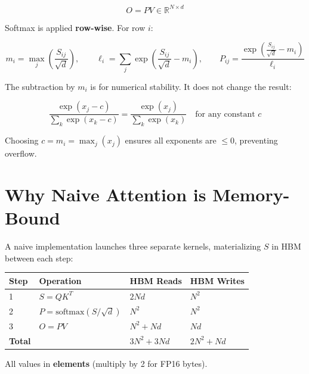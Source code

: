 \documentclass[11pt, letterpaper]{article}
\newcommand{\R}{\mathbb{R}}
\begin{document}
\begin{equation}
O = P V \in \R^{N \times d}
\end{equation}

Softmax is applied \textbf{row-wise}. For row $i$:

\begin{equation}
m_i = \max_j\!\left(\frac{S_{ij}}{\sqrt{d}}\right), \qquad
\ell_i = \sum_j \exp\!\left(\frac{S_{ij}}{\sqrt{d}} - m_i\right), \qquad
P_{ij} = \frac{\exp\!\left(\frac{S_{ij}}{\sqrt{d}} - m_i\right)}{\ell_i}
\end{equation}

The subtraction by $m_i$ is for numerical stability. It does not change the result:

\begin{equation}
\frac{\exp(x_j - c)}{\sum_k \exp(x_k - c)} = \frac{\exp(x_j)}{\sum_k \exp(x_k)} \quad \text{for any constant } c
\end{equation}

Choosing $c = m_i = \max_j(x_j)$ ensures all exponents are $\leq 0$, preventing overflow.

\section{Why Naive Attention is Memory-Bound}

A naive implementation launches three separate kernels, materializing $S$ in HBM between each step:

\begin{table}[h]
\centering
\begin{tabular}{@{}llll@{}}
\toprule
\textbf{Step} & \textbf{Operation} & \textbf{HBM Reads} & \textbf{HBM Writes} \\
\midrule
1 & $S = QK^T$                      & $2Nd$   & $N^2$ \\
2 & $P = \text{softmax}(S/\sqrt{d})$ & $N^2$   & $N^2$ \\
3 & $O = PV$                         & $N^2 + Nd$ & $Nd$ \\
\midrule
\textbf{Total} & & $3N^2 + 3Nd$ & $2N^2 + Nd$ \\
\bottomrule
\end{tabular}
\end{table}

All values in \textbf{elements} (multiply by 2 for FP16 bytes).
\end{document}
